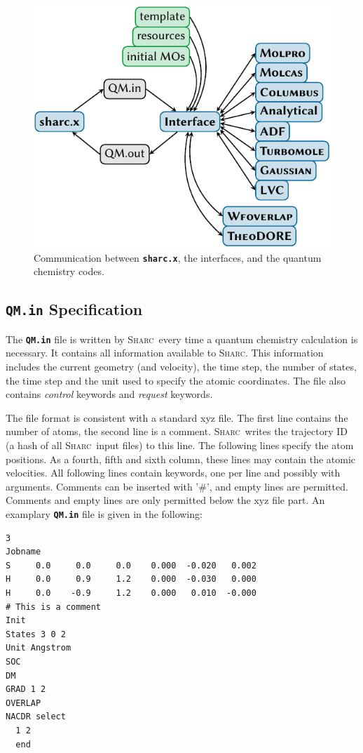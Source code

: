 \documentclass[a4paper,10pt,DIV=15,openany]{scrbook}
\newcommand{\sharc}{\textsc{Sharc}}
\newcommand{\ttt}[1]{\textbf{\texttt{#1}}}
\newenvironment{example}{
  \setlength{\OuterFrameSep}{3pt}
  \vspace{0mm}
  \definecolor{shadecolor}{HTML}{E4F4FF}
  \begin{shaded}
}{
  \end{shaded}
}
\begin{document}
\begin{figure}[htb]
  \centering
  \includegraphics[scale=1]{img/interfaces/general.pdf}
  \caption{Communication between \ttt{sharc.x}, the interfaces, and the quantum chemistry codes.}
  \label{fig:interface_general}
\end{figure}

\subsection{\ttt{QM.in} Specification}\label{intf:qmin}

The \ttt{QM.in} file is written by \sharc\ every time a quantum chemistry calculation is necessary. It contains all information available to \sharc. This information includes the current geometry (and velocity), the time step, the number of states, the time step and the unit used to specify the atomic coordinates. The file also contains \textit{control} keywords and \textit{request} keywords. 

The file format is consistent with a standard xyz file. The first line contains the number of atoms, the second line is a comment. \sharc\ writes the trajectory ID (a hash of all \sharc\ input files) to this line. The following lines specify the atom positions. As a fourth, fifth and sixth column, these lines may contain the atomic velocities.
All following lines contain keywords, one per line and possibly with arguments. Comments can be inserted with '\#', and empty lines are permitted. Comments and empty lines are only permitted below the xyz file part.
An examplary \ttt{QM.in} file is given in the following:
\begin{example}
  \begin{verbatim}
3
Jobname
S     0.0     0.0     0.0    0.000  -0.020   0.002
H     0.0     0.9     1.2    0.000  -0.030   0.000
H     0.0    -0.9     1.2    0.000   0.010  -0.000
# This is a comment
Init
States 3 0 2
Unit Angstrom
SOC
DM
GRAD 1 2
OVERLAP
NACDR select
  1 2
  end
\end{verbatim}
\end{example}
\end{document}
